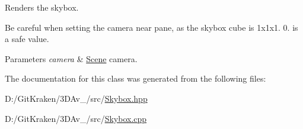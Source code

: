 Renders the skybox. 

Be careful when setting the camera near pane, as the skybox cube is 1x1x1. 0. is a safe value. 
\begin{DoxyParams}{Parameters}
{\em camera} & \mbox{\hyperlink{classoglsl_1_1_scene}{Scene}} camera. \\
\hline
\end{DoxyParams}


The documentation for this class was generated from the following files\+:\begin{DoxyCompactItemize}
\item 
D\+:/\+Git\+Kraken/3\+D\+Av\+\_/src/\mbox{\hyperlink{_skybox_8hpp}{Skybox.\+hpp}}\item 
D\+:/\+Git\+Kraken/3\+D\+Av\+\_/src/\mbox{\hyperlink{_skybox_8cpp}{Skybox.\+cpp}}\end{DoxyCompactItemize}
